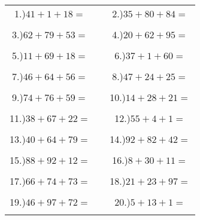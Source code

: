 \documentclass{article}
\begin{document}
\begin{tabular}{ccc}
1.)$41+1+18=$& \hspace{5cm} &2.)$35+80+84=$\\\\
3.)$62+79+53=$& \hspace{5cm} &4.)$20+62+95=$\\\\
5.)$11+69+18=$& \hspace{5cm} &6.)$37+1+60=$\\\\
7.)$46+64+56=$& \hspace{5cm} &8.)$47+24+25=$\\\\
9.)$74+76+59=$& \hspace{5cm} &10.)$14+28+21=$\\\\
11.)$38+67+22=$& \hspace{5cm} &12.)$55+4+1=$\\\\
13.)$40+64+79=$& \hspace{5cm} &14.)$92+82+42=$\\\\
15.)$88+92+12=$& \hspace{5cm} &16.)$8+30+11=$\\\\
17.)$66+74+73=$& \hspace{5cm} &18.)$21+23+97=$\\\\
19.)$46+97+72=$& \hspace{5cm} &20.)$5+13+1=$\\\\
\end{tabular}
\newpage
\end{document}
